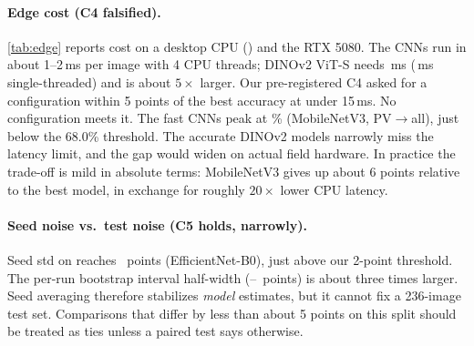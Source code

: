 \paragraph{Edge cost (C4 falsified).}
\cref{tab:edge} reports cost on a desktop CPU (\EdgeCPU) and the RTX 5080.
The CNNs run in about 1--2\,ms per image with 4 CPU threads; DINOv2 ViT-S needs \CPUfourDino\,ms (\CPUoneDino\,ms single-threaded) and is about $5\times$ larger.
Our pre-registered C4 asked for a configuration within 5 points of the best accuracy at under 15\,ms. No configuration meets it. The fast CNNs peak at \mnvthreepdallinit\% (MobileNetV3, PV$\rightarrow$all), just below the 68.0\% threshold. The accurate DINOv2 models narrowly miss the latency limit, and the gap would widen on actual field hardware.
In practice the trade-off is mild in absolute terms: MobileNetV3 gives up about 6 points relative to the best model, in exchange for roughly $20\times$ lower CPU latency.

\begin{table}[t]
\centering\scriptsize\setlength{\tabcolsep}{2pt}
\resizebox{\linewidth}{!}{}
\caption{\textbf{Inference cost} at batch 1, $224\times224$: median over 300 runs after 50 warm-up runs. CPU: ONNX Runtime with 1 or 4 threads. GPU: PyTorch bf16. Params include the 28-way head.}
\label{tab:edge}
\end{table}

\paragraph{Seed noise vs.\ test noise (C5 holds, narrowly).}
Seed std on \PD reaches \effbzeroSeedSD\ points (EfficientNet-B0), just above our 2-point threshold. The per-run bootstrap interval half-width (\CIhwMin--\CIhwMax\ points) is about three times larger.
Seed averaging therefore stabilizes \emph{model} estimates, but it cannot fix a 236-image test set. Comparisons that differ by less than about 5 points on this split should be treated as ties unless a paired test says otherwise.
